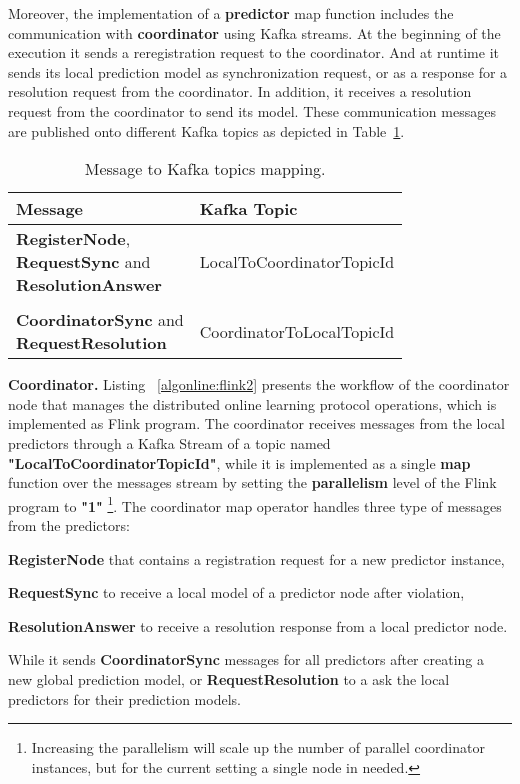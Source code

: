 \par Moreover, the implementation of  a \textbf{predictor} map function includes the communication  with \textbf{coordinator} using Kafka streams. At the beginning of the execution it sends a reregistration request to the coordinator. And at runtime it sends  its local prediction model as synchronization request,  or as a response for a resolution request from the coordinator. In addition, it receives a resolution request from the coordinator to send its model. These communication messages are published onto different  Kafka topics as depicted in Table~\ref{tab:messagesToTopics}. 

\begin{table}[h]
	\caption{Message to Kafka topics mapping.}
	\label{tab:messagesToTopics}
	\begin{tabular}{p{3cm}l}
		\toprule
		Message &Kafka Topic\\
		\midrule
		\parbox[t]{4cm}{\textbf{RegisterNode}, \\ \textbf{RequestSync} and \\\textbf{ResolutionAnswer} } &LocalToCoordinatorTopicId\\ \\
		
			  \parbox[t]{4cm}{\textbf{CoordinatorSync} and \\ \textbf{RequestResolution}} &CoordinatorToLocalTopicId\\
		
		\bottomrule
	\end{tabular}
\end{table}


\textbf{Coordinator.} Listing ~\ref{algonline:flink2} presents the workflow of the coordinator node that manages the distributed online learning protocol operations, which is implemented as Flink program. The coordinator receives messages from the local predictors through a Kafka Stream of a topic named \textbf{"LocalToCoordinatorTopicId"}, while it is implemented as a single \textbf{map} function over the messages stream by setting the \textbf{parallelism} level of the Flink program to \textbf{"1"} \footnote{Increasing the parallelism will scale up the number of parallel coordinator instances, but for the current setting a single node in needed.}. The coordinator map operator handles three type of messages from the predictors: \begin{enumerate*}[(i)]
	\item \textbf{RegisterNode} that contains  a registration request for a new predictor instance,
	\item \textbf{RequestSync} to receive a local model of a predictor node after violation,
	\item \textbf{ResolutionAnswer} to receive a resolution response from  a local predictor node.  
\end{enumerate*}  
 While it sends \textbf{CoordinatorSync} messages for all predictors after creating a new global prediction model, or \textbf{RequestResolution} to a ask the local predictors for their prediction models.
 


